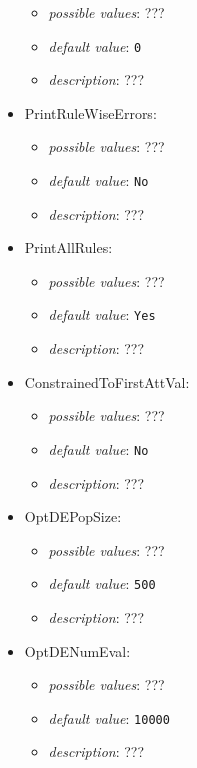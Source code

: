 \documentclass{article}
\begin{document}
\begin{itemize}
\begin{itemize}
                \item \emph{possible values}: ???
                \item \emph{default value}: \texttt{0}
                \item \emph{description}: ???
           \end{itemize}
    \item PrintRuleWiseErrors:
           \begin{itemize}
                \item \emph{possible values}: ???
                \item \emph{default value}: \texttt{No}
                \item \emph{description}: ???
           \end{itemize}
    \item PrintAllRules:
           \begin{itemize}
                \item \emph{possible values}: ???
                \item \emph{default value}: \texttt{Yes}
                \item \emph{description}: ???
           \end{itemize}
    \item ConstrainedToFirstAttVal:
           \begin{itemize}
                \item \emph{possible values}: ???
                \item \emph{default value}: \texttt{No}
                \item \emph{description}: ???
           \end{itemize}
    \item OptDEPopSize:
           \begin{itemize}
                \item \emph{possible values}: ???
                \item \emph{default value}: \texttt{500}
                \item \emph{description}: ???
           \end{itemize}
    \item OptDENumEval:
           \begin{itemize}
                \item \emph{possible values}: ???
                \item \emph{default value}: \texttt{10000}
                \item \emph{description}: ???

\end{itemize}
\end{itemize}
\end{document}
